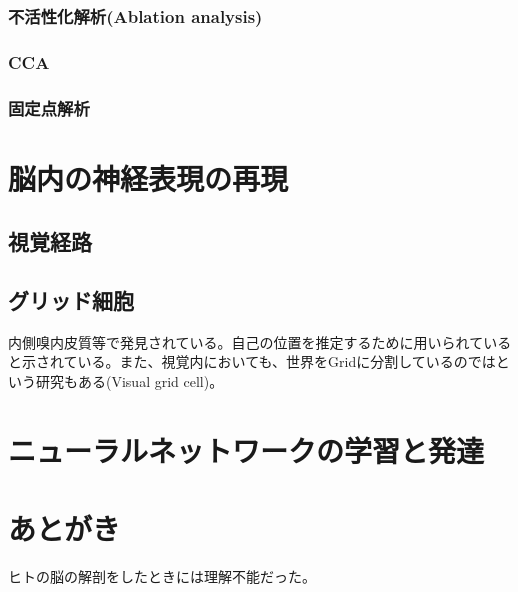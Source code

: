 \documentclass[a4j]{jarticle}
\begin{document}
\subsubsection{不活性化解析(Ablation analysis)}
\subsubsection{CCA}
\subsubsection{固定点解析}
\section{脳内の神経表現の再現}
\subsection{視覚経路}
\subsection{グリッド細胞}
内側嗅内皮質等で発見されている。自己の位置を推定するために用いられていると示されている。また、視覚内においても、世界をGridに分割しているのではという研究もある(Visual grid cell)。
\section{ニューラルネットワークの学習と発達}

\section{あとがき}
ヒトの脳の解剖をしたときには理解不能だった。
\end{document}
